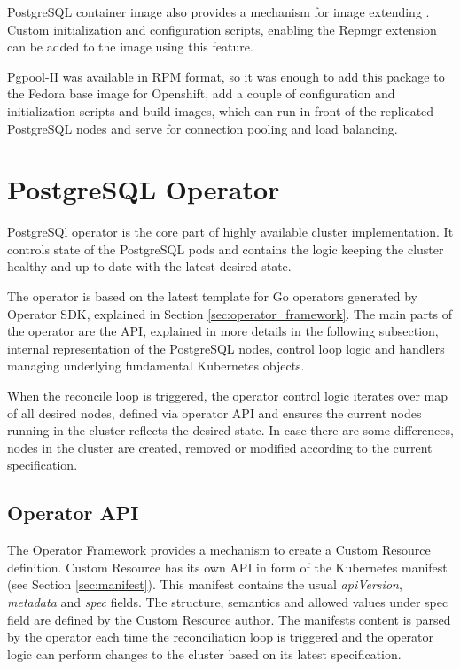 \documentclass[
  digital, %
  twoside, %
  table,   %
  lof,     %
  lot,     %
]{fithesis3}
\begin{document}
PostgreSQL container image also provides a mechanism for image extending \cite{pg_cnt_extending}. Custom initialization and configuration scripts, enabling the Repmgr extension can be added to the image using this feature.

Pgpool-II was available in RPM format, so it was enough to add this package to the Fedora base image for Openshift, add a couple of configuration and initialization scripts and build images, which can run in front of the replicated PostgreSQL nodes and serve for connection pooling and load balancing.

\section{PostgreSQL Operator}
PostgreSQl operator is the core part of highly available cluster implementation. It controls state of the PostgreSQL pods and contains the logic keeping the cluster healthy and up to date with the latest desired state.

The operator is based on the latest template for Go operators generated by Operator SDK, explained in Section \ref{sec:operator_framework}. The main parts of the operator are the API, explained in more details in the following subsection, internal representation of the PostgreSQL nodes, control loop logic and handlers managing underlying fundamental Kubernetes objects.

When the reconcile loop is triggered, the operator control logic iterates over map of all desired nodes, defined via operator API and ensures the current nodes running in the cluster reflects the desired state. In case there are some differences, nodes in the cluster are created, removed or modified according to the current specification.

\subsection{Operator API} \label{sec:operator_api}
The Operator Framework provides a mechanism to create a Custom Resource definition. Custom Resource has its own API in form of the Kubernetes manifest (see Section \ref{sec:manifest}). This manifest contains the usual \textit{apiVersion}, \textit{metadata} and \textit{spec} fields. The structure, semantics and allowed values under spec field are defined by the Custom Resource author. The manifests content is parsed by the operator each time the reconciliation loop is triggered and the operator logic can perform changes to the cluster based on its latest specification.
\end{document}
